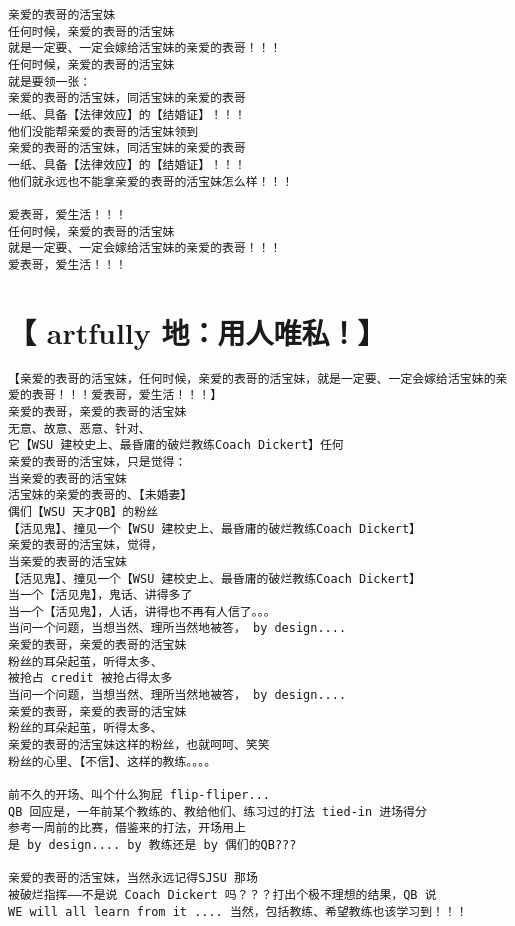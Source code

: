 \documentclass[9pt, b5paper]{article}
\begin{document}
\begin{verbatim}
亲爱的表哥的活宝妹
任何时候，亲爱的表哥的活宝妹
就是一定要、一定会嫁给活宝妹的亲爱的表哥！！！
任何时候，亲爱的表哥的活宝妹
就是要领一张：
亲爱的表哥的活宝妹，同活宝妹的亲爱的表哥
一纸、具备【法律效应】的【结婚证】！！！
他们没能帮亲爱的表哥的活宝妹领到
亲爱的表哥的活宝妹，同活宝妹的亲爱的表哥
一纸、具备【法律效应】的【结婚证】！！！
他们就永远也不能拿亲爱的表哥的活宝妹怎么样！！！

爱表哥，爱生活！！！
任何时候，亲爱的表哥的活宝妹
就是一定要、一定会嫁给活宝妹的亲爱的表哥！！！
爱表哥，爱生活！！！
\end{verbatim}

\section{【 artfully 地：用人唯私！】}
\label{sec-9}
\begin{verbatim}
【亲爱的表哥的活宝妹，任何时候，亲爱的表哥的活宝妹，就是一定要、一定会嫁给活宝妹的亲爱的表哥！！！爱表哥，爱生活！！！】
亲爱的表哥，亲爱的表哥的活宝妹
无意、故意、恶意、针对、
它【WSU 建校史上、最昏庸的破烂教练Coach Dickert】任何
亲爱的表哥的活宝妹，只是觉得：
当亲爱的表哥的活宝妹
活宝妹的亲爱的表哥的、【未婚妻】
偶们【WSU 天才QB】的粉丝
【活见鬼】、撞见一个【WSU 建校史上、最昏庸的破烂教练Coach Dickert】
亲爱的表哥的活宝妹，觉得，
当亲爱的表哥的活宝妹
【活见鬼】、撞见一个【WSU 建校史上、最昏庸的破烂教练Coach Dickert】
当一个【活见鬼】，鬼话、讲得多了
当一个【活见鬼】，人话，讲得也不再有人信了。。。
当问一个问题，当想当然、理所当然地被答， by design....
亲爱的表哥，亲爱的表哥的活宝妹
粉丝的耳朵起茧，听得太多、
被抢占 credit 被抢占得太多
当问一个问题，当想当然、理所当然地被答， by design....
亲爱的表哥，亲爱的表哥的活宝妹
粉丝的耳朵起茧，听得太多、
亲爱的表哥的活宝妹这样的粉丝，也就呵呵、笑笑
粉丝的心里、【不信】、这样的教练。。。。

前不久的开场、叫个什么狗屁 flip-fliper...
QB 回应是，一年前某个教练的、教给他们、练习过的打法 tied-in 进场得分
参考一周前的比赛，借鉴来的打法，开场用上
是 by design.... by 教练还是 by 偶们的QB???

亲爱的表哥的活宝妹，当然永远记得SJSU 那场
被破烂指挥——不是说 Coach Dickert 吗？？？打出个极不理想的结果，QB 说
WE will all learn from it .... 当然，包括教练、希望教练也该学习到！！！


\end{verbatim}
\end{document}
